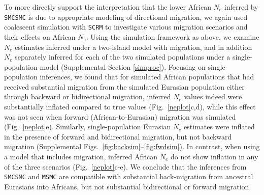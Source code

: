 \documentclass{article}
\begin{document}
To more directly support the interpretation that the lower African $N_e$ inferred by {\tt SMCSMC} is due to appropriate modeling of directional migration, we again used coalescent simulation with {\tt SCRM} to investigate various migration scenarios and their effects on African $N_e$. Using the simulation framework as above, we examine $N_e$ estimates inferred under a two-island model with migration, and in addition $N_e$ separately inferred for each of the two simulated populations under a single-population model (Supplemental Section \ref{simproc}).  Focusing on single-population inferences, we found that for simulated African populations that had received substantial migration from the simulated Eurasian population either through backward or bidirectional migration, inferred $N_e$ values indeed were substantially inflated compared to true values (Fig.\ \ref{neplot}c,d), while this effect was not seen when forward (African-to-Eurasian) migration was simulated (Fig.\ \ref{neplot}e).  
Similarly, single-population Eurasian $N_e$ estimates were inflated in the presence of forward and bidirectional migration, but not backward migration (Supplemental Figs.\ \ref{fig:backsim}--\ref{fig:fwdsim}).
In contrast, when using a model that includes migration, inferred African $N_e$ do not show inflation in any of the three scenarios (Fig.\ \ref{neplot}c-e). We conclude that the inferences from {\tt SMCSMC} and {\tt MSMC} are compatible with substantial back-migration from ancestral Eurasians into Africans, but not substantial bidirectional or forward migration.
\end{document}
